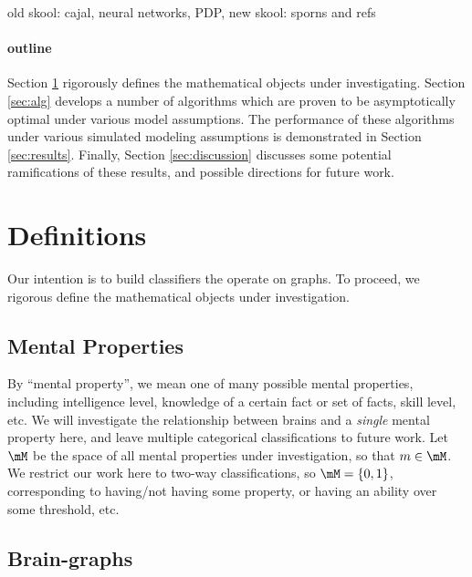 old skool: cajal, neural networks, PDP, 
new skool: sporns and refs

\paragraph{outline}


Section \ref{sec:def} rigorously defines the mathematical objects under investigating.  Section \ref{sec:alg} develops a number of algorithms which are proven to be asymptotically optimal under various model assumptions.  The performance of these algorithms under various simulated modeling assumptions is demonstrated in Section \ref{sec:results}.  Finally, Section \ref{sec:discussion} discusses some potential ramifications of these results, and possible directions for future work.


\section{Definitions} %
\label{sec:def}

Our intention is to build classifiers the operate on graphs.  To proceed, we rigorous define the mathematical objects under investigation.

\subsection{Mental Properties} %
\label{sub:mental_properties}

By ``mental property'', we mean one of many possible mental properties, including intelligence level, knowledge of a certain fact or set of facts, skill level, etc.  We will investigate the relationship between brains and a \emph{single} mental property here, and leave multiple categorical classifications to future work.  Let $\mM$ be the space of all mental properties under investigation, so that $m \in \mM$.  We restrict our work here to two-way classifications, so $\mM=\{0,1\}$, corresponding to having/not having some property, or having an ability over some threshold, etc.  


\subsection{Brain-graphs} %
\label{sub:brain_graphs}


